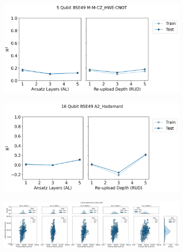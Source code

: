 \documentclass[journal=jacsat,manuscript=article]{achemso}
\begin{document}
\begin{figure}[H]
	\centering	
	\begin{subfigure}[b]{0.49\textwidth}
		\centering
		\includegraphics[width=\linewidth]{../images/BSE/fivequbit/BSE5_RUDAL_lineplot}
		\caption{}
		\label{fig:bse5RUDAL_lineplot}
	\end{subfigure}
	\hfill
	\begin{subfigure}[b]{0.49\textwidth}
		\centering
		\includegraphics[width=\linewidth]{../images/BSE/sixteenqubit/BSE16_RUDAL_lineplot}
		\caption{}
		\label{fig:bse16RUDAL_lineplot}
	\end{subfigure}
	\hfill
	\begin{subfigure}[b]{0.49\textwidth}
		\centering
		\includegraphics[width=\linewidth]{../images/BSE/fivequbit/distribution_parity}
		\caption{}
		\label{fig:BSE5_distribution_parity}
	\end{subfigure}

\end{figure}
\end{document}
